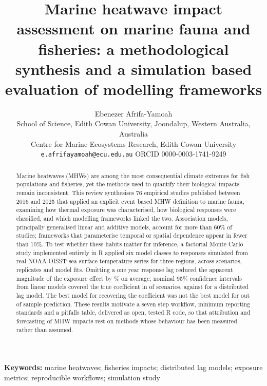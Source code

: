 \documentclass[12pt,a4paper]{article}
\begin{document}
\title{Marine heatwave impact assessment on marine fauna and fisheries: a methodological synthesis and a simulation based evaluation of modelling frameworks}
\author{Ebenezer Afrifa-Yamoah\\[2pt]
\small School of Science, Edith Cowan University, Joondalup, Western Australia, Australia\\
\small Centre for Marine Ecosystems Research, Edith Cowan University\\
\small \texttt{e.afrifayamoah@ecu.edu.au} \quad ORCID 0000-0003-1741-9249}
\date{}
\maketitle

\begin{abstract}
\noindent
Marine heatwaves (MHWs) are among the most consequential climate extremes for fish populations and fisheries, yet the methods used to quantify their biological impacts remain inconsistent. This review synthesises 76 empirical studies published between 2016 and 2025 that applied an explicit event based MHW definition to marine fauna, examining how thermal exposure was characterised, how biological responses were classified, and which modelling frameworks linked the two. Association models, principally generalised linear and additive models, account for more than 60\% of studies; frameworks that parameterise temporal or spatial dependence appear in fewer than 10\%. To test whether these habits matter for inference, a factorial Monte Carlo study implemented entirely in R applied six model classes to responses simulated from real NOAA OISST sea surface temperature series for three regions, across \nScenarios{} scenarios, \nReplicates{} replicates and \nFits{} model fits. Omitting a one year response lag reduced the apparent magnitude of the exposure effect by \naiveRelBiasLagOne{}\% on average; nominal 95\% confidence intervals from linear models covered the true coefficient in \linearCoverageRange{} of scenarios, against \dlnmCoverage{} for a distributed lag model. The best model for recovering the coefficient was not the best model for out of sample prediction. These results motivate a seven step workflow, minimum reporting standards and a pitfalls table, delivered as open, tested R code, so that attribution and forecasting of MHW impacts rest on methods whose behaviour has been measured rather than assumed.
\end{abstract}

\noindent\textbf{Keywords:} marine heatwaves; fisheries impacts; distributed lag models; exposure metrics; reproducible workflows; simulation study
\end{document}
